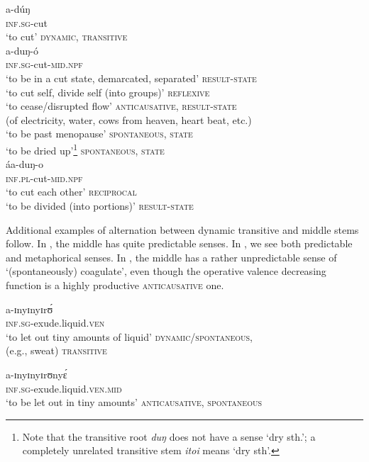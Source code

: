 \documentclass[output=paper,colorlinks,citecolor=brown
]{langscibook}
\begin{document}
\ea \label{dung}\label{ex:Payne:dung}
\begin{xlist}
\ex 
\gll a-dúŋ		 \\
\textsc{inf.sg}-cut\\
\glt ‘to cut’ \hfill \textsc{dynamic, transitive}\\

\ex 
\gll a-duŋ-ó \\
\textsc{inf.sg}-cut-\textsc{mid.npf} \\
    \glt ‘to be in a cut state, demarcated, separated’  \hfill \textsc{result-state}\\
‘to cut self, divide self (into groups)’ \hfill \textsc{reflexive}\\
‘to cease/disrupted flow’ \hfill \textsc{anticausative, result-state}\\
 (of electricity, water, cows from heaven, heart beat, etc.)  \\
‘to be past menopause’ \hfill \textsc{spontaneous, state} \\
‘to be dried up’\footnote{Note that the transitive root \textit{duŋ} does not have a sense `dry sth.'; a completely unrelated transitive stem \textit{itoi} means `dry sth'.} \hfill \textsc{spontaneous, state}\\
 
 \ex 
 \gll áa-duŋ-o 		\\
 \textsc{inf.pl}-cut-\textsc{mid.npf}	\\
  \glt ‘to cut each other’ \hfill\textsc{reciprocal}\\
  ‘to be divided (into portions)’ \hfill \textsc{result-state}
  \end{xlist}
\z 

Additional examples of alternation between dynamic transitive and middle stems follow. In , the middle has quite predictable senses. In , we see both predictable and metaphorical senses. In ,  the middle has a rather unpredictable sense of `(spontaneously) coagulate', even though the operative valence decreasing function is a highly productive \textsc{anticausative} one.

\ea \label{ex:Payne:predictable}
\begin{xlist}
\ex 
\gll a-ɪnyɪnyɪrʊ́  \\
\textsc{inf.sg}-exude.liquid.\textsc{ven}\\
\glt ‘to let out tiny amounts of liquid' \hfill \textsc{dynamic/spontaneous,}\\
\- (e.g., sweat) \hfill \textsc{transitive}

\ex	
\gll a-ɪnyɪnyɪrʊnyɛ́ \\
\textsc{inf.sg}-exude.liquid.\textsc{ven.mid}\\
\glt ‘to be let out in tiny amounts’ 		 \hfill \textsc{anticausative, spontaneous}\\ 
\end{xlist}
\z 
\end{document}
